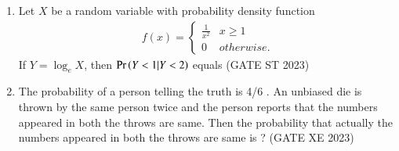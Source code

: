 \begin{enumerate}
\item Let $X$ be a random variable with probability density function
\begin{align}\
f(x) = \begin{cases}
\frac{1}{x^2} & x \geq 1 \\
0             & otherwise.
\end{cases}
\end{align}
If $Y = \log_e X$, then $\Pr\left(Y<1 | Y<2 \right)$ equals
\hfill(GATE ST 2023)\\
\solution

\item The probability of a person telling the truth is 4/6 . An unbiased die is thrown by
the same person twice and the person reports that the numbers appeared in both
the throws are same. Then the probability that actually the numbers appeared in
both the throws are same is ?
\hfill(GATE XE 2023)\\

\end{enumerate}
